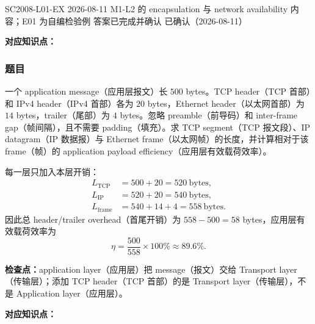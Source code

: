 

\examplemeta
  {SC2008-L01-EX}
  {2026-08-11}
  {M1-L2 的 encapsulation 与 network availability 内容；E01 为自编检验例}
  {答案已完成并确认}
  {已确认（2026-08-11）}


\textbf{对应知识点：}

\subsubsection*{题目}

一个 application message（应用层报文）长 $500$ bytes。TCP header（TCP 首部）和 IPv4 header（IPv4 首部）各为 $20$ bytes，Ethernet header（以太网首部）为 $14$ bytes，trailer（尾部）为 $4$ bytes。忽略 preamble（前导码）和 inter-frame gap（帧间隔），且不需要 padding（填充）。求 TCP segment（TCP 报文段）、IP datagram（IP 数据报）与 Ethernet frame（以太网帧）的长度，并计算相对于该 frame（帧）的 application payload efficiency（应用层有效载荷效率）。

\begin{workedsolution}
每一层只加入本层开销：
\begin{align*}
  L_{\mathrm{TCP}} &= 500+20=520\ \text{bytes},\\
  L_{\mathrm{IP}}  &= 520+20=540\ \text{bytes},\\
  L_{\mathrm{frame}} &= 540+14+4=558\ \text{bytes}.
\end{align*}
因此总 header/trailer overhead（首尾开销）为 $558-500=58$ bytes，应用层有效载荷效率为
\[
  \eta=\frac{500}{558}\times 100\%\approx 89.6\%.
\]
\end{workedsolution}

\textbf{检查点：}application layer（应用层）把 message（报文）交给 Transport layer（传输层）；添加 TCP header（TCP 首部）的是 Transport layer（传输层），不是 Application layer（应用层）。


\textbf{对应知识点：}

